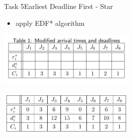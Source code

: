 \begin{frame}[allowframebreaks]{Task 5}{Earliest Deadline First - Star\vspace{0.5cm}}
  \begin{tasknoinc}
    \begin{itemize}
      \item apply \alert{EDF* algorithm}
    \end{itemize}
    \centering
    \includegraphics[width=0.5\textwidth]{./figures/5_table.png}
  \end{tasknoinc}
  \begin{solution}
    \centering
    \includegraphics[width=0.5\textwidth]{./figures/5_table_sol.png}
  \end{solution}
\end{frame}
